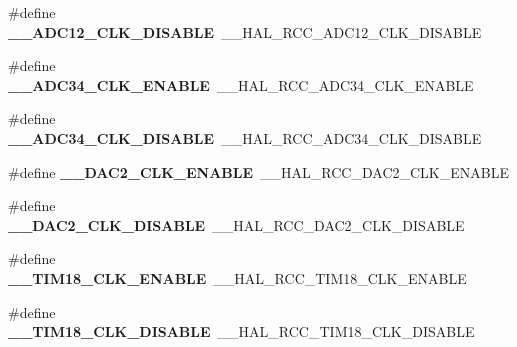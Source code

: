 \begin{DoxyCompactItemize}
\item 
\mbox{\label{group___h_a_l___r_c_c___aliased_gabe7e11fce558e2053cdb0ae751126536}} 
\#define {\bfseries \+\_\+\+\_\+\+A\+D\+C12\+\_\+\+C\+L\+K\+\_\+\+D\+I\+S\+A\+B\+LE}~\+\_\+\+\_\+\+H\+A\+L\+\_\+\+R\+C\+C\+\_\+\+A\+D\+C12\+\_\+\+C\+L\+K\+\_\+\+D\+I\+S\+A\+B\+LE
\item 
\mbox{\label{group___h_a_l___r_c_c___aliased_gad254ae5b9760ec6cc0b9be3f542b22db}} 
\#define {\bfseries \+\_\+\+\_\+\+A\+D\+C34\+\_\+\+C\+L\+K\+\_\+\+E\+N\+A\+B\+LE}~\+\_\+\+\_\+\+H\+A\+L\+\_\+\+R\+C\+C\+\_\+\+A\+D\+C34\+\_\+\+C\+L\+K\+\_\+\+E\+N\+A\+B\+LE
\item 
\mbox{\label{group___h_a_l___r_c_c___aliased_ga7d658c3accc90e210938a08bb313a6be}} 
\#define {\bfseries \+\_\+\+\_\+\+A\+D\+C34\+\_\+\+C\+L\+K\+\_\+\+D\+I\+S\+A\+B\+LE}~\+\_\+\+\_\+\+H\+A\+L\+\_\+\+R\+C\+C\+\_\+\+A\+D\+C34\+\_\+\+C\+L\+K\+\_\+\+D\+I\+S\+A\+B\+LE
\item 
\mbox{\label{group___h_a_l___r_c_c___aliased_gae4c367c2fb13b1c443b9c2ead24c2589}} 
\#define {\bfseries \+\_\+\+\_\+\+D\+A\+C2\+\_\+\+C\+L\+K\+\_\+\+E\+N\+A\+B\+LE}~\+\_\+\+\_\+\+H\+A\+L\+\_\+\+R\+C\+C\+\_\+\+D\+A\+C2\+\_\+\+C\+L\+K\+\_\+\+E\+N\+A\+B\+LE
\item 
\mbox{\label{group___h_a_l___r_c_c___aliased_gacfc9ef4fb5d3565351542b14e6d7830e}} 
\#define {\bfseries \+\_\+\+\_\+\+D\+A\+C2\+\_\+\+C\+L\+K\+\_\+\+D\+I\+S\+A\+B\+LE}~\+\_\+\+\_\+\+H\+A\+L\+\_\+\+R\+C\+C\+\_\+\+D\+A\+C2\+\_\+\+C\+L\+K\+\_\+\+D\+I\+S\+A\+B\+LE
\item 
\mbox{\label{group___h_a_l___r_c_c___aliased_ga299d99f2c8deaffbee002dd70a5c8f15}} 
\#define {\bfseries \+\_\+\+\_\+\+T\+I\+M18\+\_\+\+C\+L\+K\+\_\+\+E\+N\+A\+B\+LE}~\+\_\+\+\_\+\+H\+A\+L\+\_\+\+R\+C\+C\+\_\+\+T\+I\+M18\+\_\+\+C\+L\+K\+\_\+\+E\+N\+A\+B\+LE
\item 
\mbox{\label{group___h_a_l___r_c_c___aliased_gad29b4581580af1d318589d2c0403f4ab}} 
\#define {\bfseries \+\_\+\+\_\+\+T\+I\+M18\+\_\+\+C\+L\+K\+\_\+\+D\+I\+S\+A\+B\+LE}~\+\_\+\+\_\+\+H\+A\+L\+\_\+\+R\+C\+C\+\_\+\+T\+I\+M18\+\_\+\+C\+L\+K\+\_\+\+D\+I\+S\+A\+B\+LE

\end{DoxyCompactItemize}

